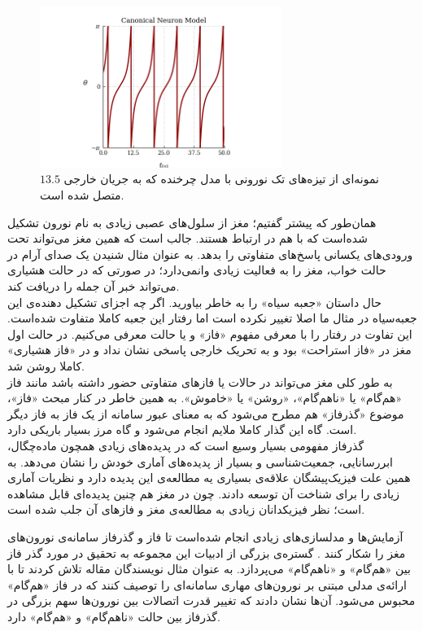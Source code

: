 \begin{figure}
	\centering
	\includegraphics[width=0.7\textwidth]{Figures/canonical_model_spike_pattern.png}
	\caption{
		نمونه‌ای از تیزه‌های تک نورونی با مدل چرخنده که به جریان خارجی
$13.5$
 متصل شده است.}
	\label{fig:canonical_model_spike_pattern}
\end{figure}
همان‌طور که پیشتر گفتیم؛ مغز از سلول‌های عصبی زیادی به نام نورون تشکیل شده‌است که با هم در ارتباط هستند. جالب است که همین مغز می‌تواند تحت ورودی‌های یکسانی پاسخ‌های متفاوتی را بدهد. به عنوان مثال شنیدن یک صدای آرام در حالت خواب، مغز را به فعالیت زیادی وانمی‌دارد؛ در صورتی که در حالت هشیاری می‌تواند خبر آن جمله را دریافت کند.\\
حال داستان «جعبه سیاه» را به خاطر بیاورید. اگر چه اجزای تشکیل دهنده‌ی این جعبه‌سیاه در مثال ما اصلا تغییر نکرده است اما رفتار این جعبه کاملا متفاوت شده‌است. این تفاوت در رفتار را با معرفی مفهوم «فاز» و یا حالت معرفی می‌کنیم. در حالت اول مغز در «فاز استراحت» بود و به تحریک خارجی پاسخی نشان نداد و در «فاز هشیاری» کاملا روشن شد.\\
به طور کلی مغز می‌تواند در حالات یا فازهای متفاوتی حضور داشته باشد مانند فاز «هم‌گام» یا «ناهم‌گام»، «روشن» یا «خاموش». به همین خاطر در کنار مبحث «فاز»، موضوع «گذرفاز» هم مطرح می‌شود که به معنای عبور سامانه از یک فاز به فاز دیگر است. گاه این گذار کاملا ملایم انجام می‌شود و گاه مرز بسیار باریکی دارد.\\

گذرفاز مفهومی بسیار وسیع است که در پدیده‌های زیادی همچون ماده‌چگال، ابررسانایی، جمعیت‌شناسی و بسیار از پدیده‌های آماری خودش را نشان می‌دهد. به همین علت فیزیک‌پیشگان علاقه‌ی بسیاری یه مطالعه‌ی این پدیده دارد و نظریات آماری زیادی را برای شناخت آن توسعه دادند. چون در مغز هم چنین پدیده‌ای قابل مشاهده است؛ نظر فیزیکدانان زیادی به مطالعه‌ی مغز و فازهای آن جلب شده است.

آزمایش‌ها و مدلسازی‌های زیادی انجام شده‌است تا فاز و گذرفاز سامانه‌ی نورون‌های مغز را شکار کنند 
\cite{WILTING2019105}.
گستره‌ی بزرگی از ادبیات این مجموعه به تحقیق در مورد گذر فاز بین «هم‌گام» و «نا‌هم‌گام» می‌پردازد. به عنوان مثال نویسندگان مقاله
\cite{PhysRevLett.105.158104}
تلاش کردند تا با ارائه‌ی مدلی مبتنی بر نورون‌های مهاری سامانه‌ای را توصیف کنند که در فاز «هم‌گام» محبوس می‌شود. آن‌ها نشان دادند که تغییر قدرت اتصالات بین نورون‌ها سهم بزرگی در گذرفاز بین حالت «ناهم‌گام» و «هم‌گام» دارد.

